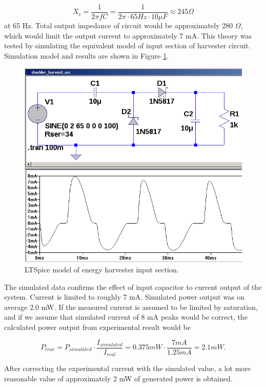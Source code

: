 \begin{equation}
  X_c = \frac{1}{2 \pi f C}  = \frac{1}{2 \pi \cdot 65 Hz \cdot 10\mu F} \approx 245 \Omega
\end{equation}
at 65 Hz. Total output impedance of circuit would be approximately 280 $\Omega$, which would limit the output current to approximately 7 mA. This theory was tested by simulating the equivalent model of input section of harvester circuit. Simulation model and results are shown in Figure \ref{fig:simulated_doubler}.

\begin{figure}[htb]
\begin{center}
\includegraphics[height=10cm]{images/own_dwg/simulation/voltage_doubler.png}
\end{center}
\caption{\label{fig:simulated_doubler} LTSpice model of energy harvester input section.}
\end{figure}

The simulated data confirms the effect of input capacitor to current output of the system. Current is limited to roughly 7 mA. Simulated power output was on average 2.0 mW. If the measured current is assumed to be limited by saturation, and if we assume that simulated current of 8 mA peaks would be correct, the calculated power output from experimental result would be 

\begin{equation}
  P_{true} = P_{simulated} \cdot \frac{I_{simulated}}{I_{real}} = 0.375 mW \cdot \frac{7 mA}{1.25 mA} = 2.1 mW.
\end{equation}

After correcting the experimental current with the simulated value, a lot more reasonable value of approximately 2 mW of generated power is obtained. 

